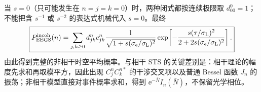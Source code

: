 当 $s=0$（只可能发生在 $n=j=k=0$）时，两种闭式都按连续极限取 $d_{00}^{0}=1$；不能把含 $s^{-1}$ 或 $s^{-2}$ 的表达式机械代入 $s=0$。最终
\begin{equation}
\boxed{
P_{\rm EEGS}^{\rm incoh}(n)
=\sum_{j,k\ge0}d_{jk}^n c_{jk}^n
\frac{1}{\sqrt{1+s(\sigma_{\mathrm e}/\sigma_{\mathrm L})^2}}
\exp\!\left[
-\frac{s(\tau/\sigma_{\mathrm L})^2}
{2+2s(\sigma_{\mathrm e}/\sigma_{\mathrm L})^2}
\right].}
\label{eq:incoherent-observed-spectrum}
\end{equation}
由此得到完整的非相干时空平均概率。与相干 STS 的关键差别是：相干理论的幅度先求和再取模平方，因此出现 \(C_j^nC_k^{n*}\) 的干涉交叉项以及普通 Bessel 函数 \(J_n\) 的振荡；非相干模型直接对事件概率求和，得到 \(\ee^{-\bar N}I_n(\bar N)\)，不保留光学相位。



